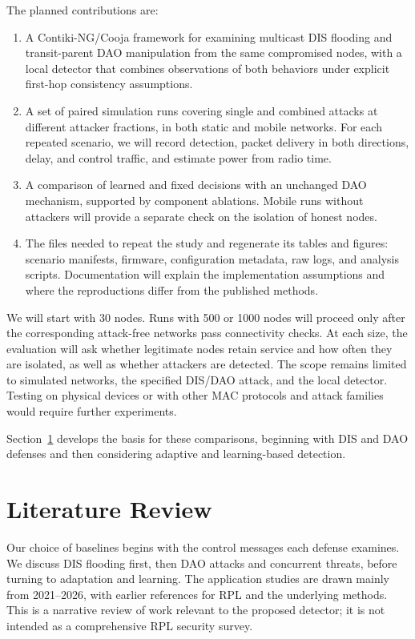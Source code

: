 \documentclass[journal]{IEEEtran}
\begin{document}
The planned contributions are:
\begin{enumerate}
\item A Contiki-NG/Cooja framework for examining multicast DIS flooding and transit-parent DAO manipulation from the same compromised nodes, with a local detector that combines observations of both behaviors under explicit first-hop consistency assumptions.
\item A set of paired simulation runs covering single and combined attacks at different attacker fractions, in both static and mobile networks. For each repeated scenario, we will record detection, packet delivery in both directions, delay, and control traffic, and estimate power from radio time.
\item A comparison of learned and fixed decisions with an unchanged DAO mechanism, supported by component ablations. Mobile runs without attackers will provide a separate check on the isolation of honest nodes.
\item The files needed to repeat the study and regenerate its tables and figures: scenario manifests, firmware, configuration metadata, raw logs, and analysis scripts. Documentation will explain the implementation assumptions and where the reproductions differ from the published methods.
\end{enumerate}

We will start with 30 nodes. Runs with 500 or 1000 nodes will proceed only after the corresponding attack-free networks pass connectivity checks. At each size, the evaluation will ask whether legitimate nodes retain service and how often they are isolated, as well as whether attackers are detected. The scope remains limited to simulated networks, the specified DIS/DAO attack, and the local detector. Testing on physical devices or with other MAC protocols and attack families would require further experiments.

Section~\ref{sec:related} develops the basis for these comparisons, beginning with DIS and DAO defenses and then considering adaptive and learning-based detection.

\section{Literature Review}\label{sec:related}
Our choice of baselines begins with the control messages each defense examines. We discuss DIS flooding first, then DAO attacks and concurrent threats, before turning to adaptation and learning. The application studies are drawn mainly from 2021--2026, with earlier references for RPL and the underlying methods. This is a narrative review of work relevant to the proposed detector; it is not intended as a comprehensive RPL security survey.
\end{document}
